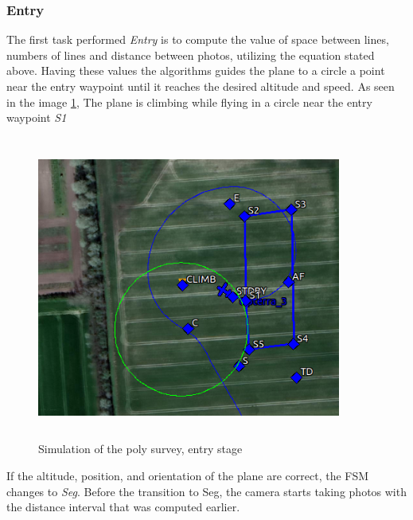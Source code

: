 \subsubsection{Entry}
The first task performed \textit{Entry} is to compute the value of space between lines, numbers of lines and distance between photos, utilizing the equation stated above. Having these values the algorithms guides the plane to a circle a point near the entry waypoint until it reaches the desired altitude and speed. As seen in the image \ref{fig:entry_stage}, The plane is climbing while flying in a circle near the entry waypoint \textit{S1}
\begin{figure}[H]
\centering
\includegraphics[width=10cm,height=10cm,keepaspectratio]{imagenes/Entry.png}
\caption{Simulation of the poly survey, entry stage}
\label{fig:entry_stage}
\end{figure}
If the altitude, position, and orientation of the plane are correct, the FSM changes to \textit{Seg}. Before the transition to Seg, the camera starts taking photos with the distance interval that was computed earlier.
